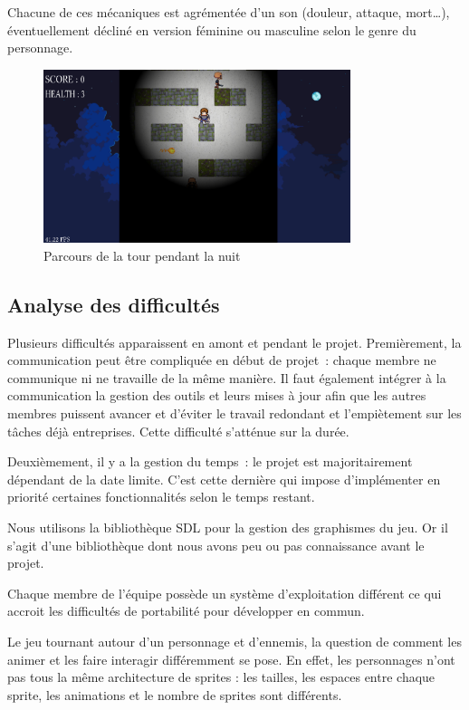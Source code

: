 \documentclass[a4paper,12pt]{article}
\begin{document}
Chacune de ces mécaniques est agrémentée d’un son (douleur, attaque, mort…), éventuellement décliné en version féminine ou masculine selon le genre du personnage.

\begin{figure}[H]
	\centering
	\includegraphics[width=0.8\textwidth]{img/ecran_nuit.png}
	\caption{Parcours de la tour pendant la nuit}
	\label{tour_nuit}
\end{figure}


\subsection{Analyse des difficultés}
Plusieurs difficultés apparaissent en amont et pendant le projet. 
Premièrement, la communication peut être compliquée en début de projet : chaque membre ne communique ni ne travaille de la même manière.
Il faut également intégrer à la communication la gestion des outils et leurs mises à jour afin que les autres membres puissent avancer et d’éviter le travail redondant et l’empiètement sur les tâches déjà entreprises.
Cette difficulté s'atténue sur la durée.

Deuxièmement, il y a la gestion du temps : le projet est majoritairement dépendant de la date limite.
C’est cette dernière qui impose d’implémenter en priorité certaines fonctionnalités selon le temps restant.

Nous utilisons la bibliothèque SDL pour la gestion des graphismes du jeu. Or il s’agit d’une bibliothèque dont nous avons peu ou pas connaissance avant le projet.

Chaque membre de l’équipe possède un système d’exploitation différent ce qui accroit les difficultés de portabilité pour développer en commun.

Le jeu tournant autour d’un personnage et d’ennemis, la question de comment les animer et les faire interagir différemment se pose. 
En effet, les personnages n’ont pas tous la même architecture de sprites :  les tailles,  les espaces entre chaque sprite, les animations et le nombre de sprites sont différents.
\end{document}
